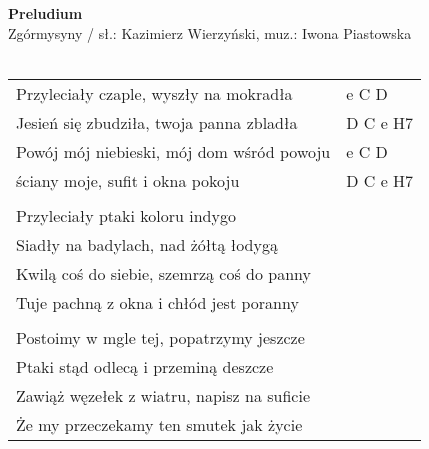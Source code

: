 \documentclass[a5paper]{article}
\begin{document}


\noindent
\fontsize{12pt}{15pt}\selectfont
\textbf{Preludium} \\
\fontsize{8pt}{10pt}\selectfont
Zgórmysyny / sł.: Kazimierz Wierzyński, muz.: Iwona Piastowska \\ \\
\fontsize{10pt}{12pt}\selectfont
{}
\begin{tabular}{@{}p{7.50cm}p{3cm}@{}}
\noindent
Przyleciały czaple, wyszły na mokradła & e C D \\
Jesień się zbudziła, twoja panna zbladła & D C e H7 \\
Powój mój niebieski, mój dom wśród powoju & e C D \\
ściany moje, sufit i okna pokoju & D C e H7 \\ \\

Przyleciały ptaki koloru indygo \\
Siadły na badylach, nad żółtą łodygą \\
Kwilą coś do siebie, szemrzą coś do panny \\
Tuje pachną z okna i chłód jest poranny \\ \\

Postoimy w mgle tej, popatrzymy jeszcze \\
Ptaki stąd odlecą i przeminą deszcze \\
Zawiąż węzełek z wiatru, napisz na suficie \\
Że my przeczekamy ten smutek jak życie
\end{tabular}
\end{document}
